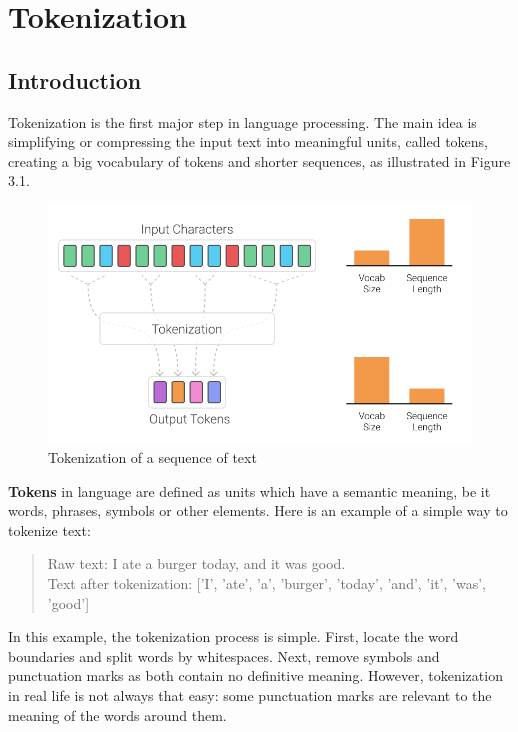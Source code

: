 %
%

\chapter{Tokenization}\label{sec:tokenization}

\section{Introduction}

Tokenization is the first major step in language processing. The main idea is simplifying or compressing the input text into meaningful units, called tokens, creating a big vocabulary of tokens and shorter sequences, as illustrated in Figure 3.1.~\cite{manning2008introduction}

\begin{figure}[!ht]
    \centering
    \includegraphics[width=14cm]{figures/tokenization.png}
    \caption{Tokenization of a sequence of text}
\end{figure}

\textbf{Tokens} in language are defined as units which have a semantic meaning, be it words, phrases, symbols or other elements. Here is an example of a simple way to tokenize text:

\begin{quote}
    Raw text: I ate a burger today, and it was good.\\
    Text after tokenization: ['I', 'ate', 'a', 'burger', 'today', 'and', 'it', 'was', 'good']
\end{quote}

In this example, the tokenization process is simple. First, locate the word boundaries and split words by whitespaces. Next, remove symbols and punctuation marks as both contain no definitive meaning. However, tokenization in real life is not always that easy: some punctuation marks are relevant to the meaning of the words around them.

